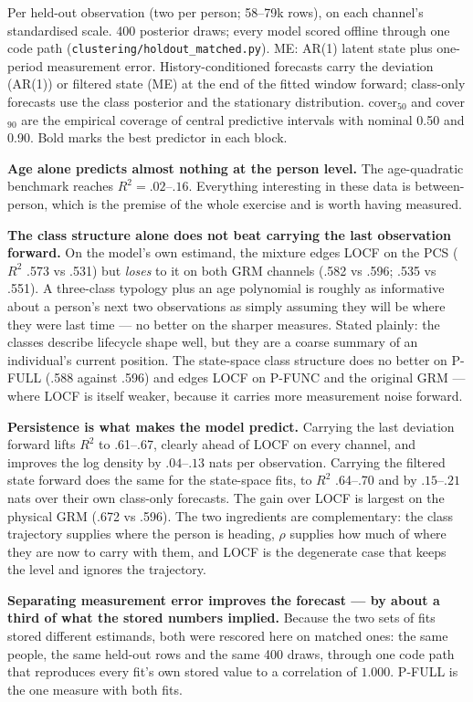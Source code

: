 \documentclass[11pt]{article}
\newcommand{\code}[1]{\texttt{\small #1}}
\begin{document}
\begin{center}
{\scriptsize Per held-out observation (two per person; 58--79k rows), on each
channel's standardised scale. 400 posterior draws; every model scored offline
through one code path (\code{clustering/holdout\_matched.py}). ME: AR(1)
latent state plus one-period measurement error. History-conditioned forecasts
carry the deviation (AR(1)) or filtered state (ME) at the end of the fitted
window forward; class-only forecasts use the class posterior and the
stationary distribution. cover$_{50}$ and cover$_{90}$ are the empirical
coverage of central predictive intervals with nominal 0.50 and 0.90. Bold
marks the best predictor in each block.}
\end{center}

\textbf{Age alone predicts almost nothing at the person level.} The
age-quadratic benchmark reaches $R^2 = .02$--$.16$. Everything interesting
in these data is between-person, which is the premise of the whole exercise
and is worth having measured.

\textbf{The class structure alone does not beat carrying the last
observation forward.} On the model's own estimand, the mixture edges LOCF on
the PCS ($R^2$ .573 vs .531) but \emph{loses} to it on both GRM channels
(.582 vs .596; .535 vs .551). A three-class typology plus an age polynomial
is roughly as informative about a person's next two observations as simply
assuming they will be where they were last time --- no better on the sharper
measures. Stated plainly: the classes describe lifecycle shape well, but
they are a coarse summary of an individual's current position. The
state-space class structure does no better on P-FULL (.588 against .596) and
edges LOCF on P-FUNC and the original GRM --- where LOCF is itself weaker,
because it carries more measurement noise forward.

\textbf{Persistence is what makes the model predict.} Carrying the last
deviation forward lifts $R^2$ to .61--.67, clearly ahead of LOCF on every
channel, and improves the log density by $.04$--$.13$ nats per observation.
Carrying the filtered state forward does the same for the state-space fits,
to $R^2$ .64--.70 and by $.15$--$.21$ nats over their own class-only
forecasts.
The gain over LOCF is largest on the physical GRM (.672 vs .596). The two
ingredients are complementary: the class trajectory supplies where the
person is heading, $\rho$ supplies how much of where they are now to carry
with them, and LOCF is the degenerate case that keeps the level and ignores
the trajectory.

\textbf{Separating measurement error improves the forecast --- by about a
third of what the stored numbers implied.} Because the two sets of fits
stored different estimands, both were rescored here on matched ones: the same
people, the same held-out rows and the same 400 draws, through one code path
that reproduces every fit's own stored value to a correlation of $1.000$.
P-FULL is the one measure with both fits.
\end{document}
